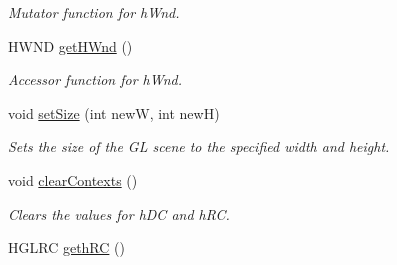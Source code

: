 \begin{DoxyCompactItemize}
\begin{DoxyCompactList}\small\item\em Mutator function for hWnd. \end{DoxyCompactList}\item 
HWND \hyperlink{class_mosaic_base_a0979962f316f25260d7c79f710623257}{getHWnd} ()
\begin{DoxyCompactList}\small\item\em Accessor function for hWnd. \end{DoxyCompactList}\item 
void \hyperlink{class_mosaic_base_ae3bac64c9cd05be167b3066fa6ae6451}{setSize} (int newW, int newH)
\begin{DoxyCompactList}\small\item\em Sets the size of the GL scene to the specified width and height. \end{DoxyCompactList}\item 
void \hyperlink{class_mosaic_base_ac053a437b189c8b3e815cd8d83953f30}{clearContexts} ()
\begin{DoxyCompactList}\small\item\em Clears the values for hDC and hRC. \end{DoxyCompactList}\item 
HGLRC \hyperlink{class_mosaic_base_a0823750a26c7168592117ee04128248d}{gethRC} ()
\end{DoxyCompactItemize}
